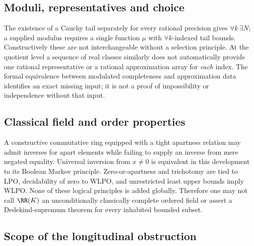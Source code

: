 \subsection{Moduli, representatives and choice}\label{supp:16-2}
\par{}\par\smallskip

The existence of a Cauchy tail separately for every rational precision gives $\forall k\,\exists N$; a supplied modulus requires a single function $\mu$ with $\forall k$-indexed tail bounds. Constructively these are not interchangeable without a selection principle. At the quotient level a sequence of real classes similarly does not automatically provide one rational representative or a rational approximation array for \emph{each} index. The formal equivalence between modulated completeness and approximation data identifies an exact missing input; it is not a proof of impossibility or independence without that input.

\subsection{Classical field and order properties}\label{supp:16-3}
\par{}\par\smallskip

A constructive commutative ring equipped with a tight apartness relation may admit inverses for apart elements while failing to supply an inverse from mere negated equality. Universal inversion from $x\ne0$ is equivalent in this development to its Boolean Markov principle. Zero-or-apartness and trichotomy are tied to LPO, decidability of zero to WLPO, and unrestricted least upper bounds imply WLPO. None of these logical principles is added globally. Therefore one may not call $\RR(K)$ an unconditionally classically complete ordered field or assert a Dedekind-supremum theorem for every inhabited bounded subset.

\subsection{Scope of the longitudinal obstruction}\label{supp:16-4}
\par{}\par\smallskip

